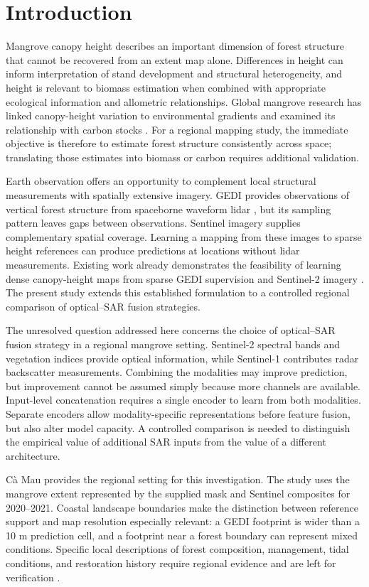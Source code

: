 \section{Introduction}

Mangrove canopy height describes an important dimension of forest structure that cannot be recovered from an extent map alone. Differences in height can inform interpretation of stand development and structural heterogeneity, and height is relevant to biomass estimation when combined with appropriate ecological information and allometric relationships. Global mangrove research has linked canopy-height variation to environmental gradients and examined its relationship with carbon stocks \citep{simard2019}. For a regional mapping study, the immediate objective is therefore to estimate forest structure consistently across space; translating those estimates into biomass or carbon requires additional validation.

Earth observation offers an opportunity to complement local structural measurements with spatially extensive imagery. GEDI provides observations of vertical forest structure from spaceborne waveform lidar \citep{dubayah2020}, but its sampling pattern leaves gaps between observations. Sentinel imagery supplies complementary spatial coverage. Learning a mapping from these images to sparse height references can produce predictions at locations without lidar measurements. Existing work already demonstrates the feasibility of learning dense canopy-height maps from sparse GEDI supervision and Sentinel-2 imagery \citep{lang2023}. The present study extends this established formulation to a controlled regional comparison of optical--SAR fusion strategies.

The unresolved question addressed here concerns the choice of optical--SAR fusion strategy in a regional mangrove setting. Sentinel-2 spectral bands and vegetation indices provide optical information, while Sentinel-1 contributes radar backscatter measurements. Combining the modalities may improve prediction, but improvement cannot be assumed simply because more channels are available. Input-level concatenation requires a single encoder to learn from both modalities. Separate encoders allow modality-specific representations before feature fusion, but also alter model capacity. A controlled comparison is needed to distinguish the empirical value of additional SAR inputs from the value of a different architecture.

Cà Mau provides the regional setting for this investigation. The study uses the mangrove extent represented by the supplied mask and Sentinel composites for 2020--2021. Coastal landscape boundaries make the distinction between reference support and map resolution especially relevant: a GEDI footprint is wider than a 10 m prediction cell, and a footprint near a forest boundary can represent mixed conditions. Specific local descriptions of forest composition, management, tidal conditions, and restoration history require regional evidence and are left for verification .


